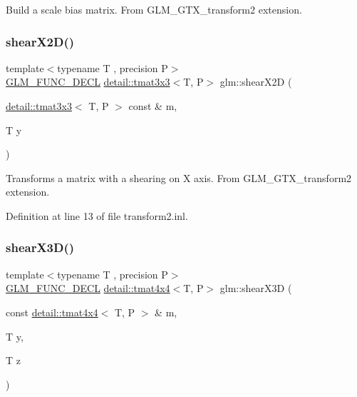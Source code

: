 Build a scale bias matrix. From G\+L\+M\+\_\+\+G\+T\+X\+\_\+transform2 extension. \mbox{\label{group__gtx__transform2_gaa5a2d9216b3298b03252e549de6fd98a}} 
\subsubsection{\texorpdfstring{shear\+X2\+D()}{shearX2D()}}
{\footnotesize\ttfamily template$<$typename T , precision P$>$ \\
\hyperlink{setup_8hpp_ab2d052de21a70539923e9bcbf6e83a51}{G\+L\+M\+\_\+\+F\+U\+N\+C\+\_\+\+D\+E\+CL} \hyperlink{structglm_1_1detail_1_1tmat3x3}{detail\+::tmat3x3}$<$T, P$>$ glm\+::shear\+X2D (\begin{DoxyParamCaption}\item[{\hyperlink{structglm_1_1detail_1_1tmat3x3}{detail\+::tmat3x3}$<$ T, P $>$ const \&}]{m,  }\item[{T}]{y }\end{DoxyParamCaption})}

Transforms a matrix with a shearing on X axis. From G\+L\+M\+\_\+\+G\+T\+X\+\_\+transform2 extension. 

Definition at line 13 of file transform2.\+inl.

\mbox{\label{group__gtx__transform2_gaae5bbb490a3d798b083cbec0e0c2e94c}} 
\subsubsection{\texorpdfstring{shear\+X3\+D()}{shearX3D()}}
{\footnotesize\ttfamily template$<$typename T , precision P$>$ \\
\hyperlink{setup_8hpp_ab2d052de21a70539923e9bcbf6e83a51}{G\+L\+M\+\_\+\+F\+U\+N\+C\+\_\+\+D\+E\+CL} \hyperlink{structglm_1_1detail_1_1tmat4x4}{detail\+::tmat4x4}$<$T, P$>$ glm\+::shear\+X3D (\begin{DoxyParamCaption}\item[{const \hyperlink{structglm_1_1detail_1_1tmat4x4}{detail\+::tmat4x4}$<$ T, P $>$ \&}]{m,  }\item[{T}]{y,  }\item[{T}]{z }\end{DoxyParamCaption})}

